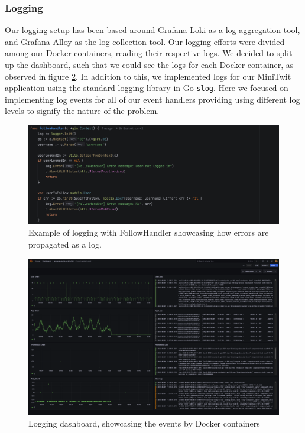 \subsubsection{Logging}
Our logging setup has been based around Grafana Loki as a log aggregation tool, and Grafana Alloy as the log collection tool. Our logging efforts were divided among our Docker containers, reading their respective logs. We decided to split up the dashboard, such that we could see the logs for each Docker container, as observed in figure \ref{fig:logging}. In addition to this, we implemented logs for our MiniTwit application using the standard logging library in Go \texttt{slog}. Here we focused on implementing log events for all of our event handlers providing using different log levels to signify the nature of the problem.

\begin{figure} [H]
    \centering
    \includegraphics[width=1\linewidth]{pictures/StdLog.png}
    \caption{Example of logging with FollowHandler showcasing how errors are propagated as a log.}
    \label{fig:enter-label}
\end{figure}
\begin{figure} [H]
    \centering
    \includegraphics[width=1\linewidth]{pictures/logging.png}
    \caption{Logging dashboard, showcasing the events by Docker containers}
    \label{fig:logging}
\end{figure}

